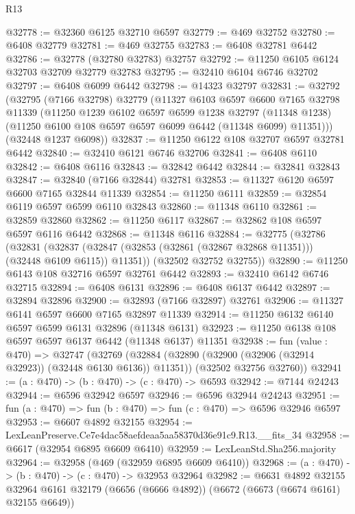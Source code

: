 \begin{lexlean}{R13}
\begin{coremodule}
@32778 := @32360 @6125 @32710 @6597
@32779 := @469 @32752
@32780 := @6408 @32779
@32781 := @469 @32755
@32783 := @6408 @32781 @6442
@32786 := @32778 (@32780 @32783) @32757
@32792 := @11250 @6105 @6124 @32703 @32709 @32779 @32783
@32795 := @32410 @6104 @6746 @32702
@32797 := @6408 @6099 @6442
@32798 := @14323 @32797
@32831 := @32792
    (@32795
      (@7166 @32798)
      @32779
      (@11327
        @6103
        @6597
        @6600
        @7165
        @32798
        @11339
        (@11250
          @1239
          @6102
          @6597
          @6599
          @1238
          @32797
          (@11348 @1238)
          (@11250 @6100 @108 @6597 @6597 @6099 @6442 (@11348 @6099) @11351)))
      (@32448 @1237 @6098))
@32837 := @11250 @6122 @108 @32707 @6597 @32781 @6442
@32840 := @32410 @6121 @6746 @32706
@32841 := @6408 @6110
@32842 := @6408 @6116
@32843 := @32842 @6442
@32844 := @32841 @32843
@32847 := @32840 (@7166 @32844) @32781
@32853 := @11327 @6120 @6597 @6600 @7165 @32844 @11339
@32854 := @11250 @6111
@32859 := @32854 @6119 @6597 @6599 @6110 @32843
@32860 := @11348 @6110
@32861 := @32859 @32860
@32862 := @11250 @6117
@32867 := @32862 @108 @6597 @6597 @6116 @6442
@32868 := @11348 @6116
@32884 := @32775
    (@32786
      (@32831
        (@32837 (@32847 (@32853 (@32861 (@32867 @32868 @11351))) (@32448 @6109 @6115)) @11351))
      (@32502 @32752 @32755))
@32890 := @11250 @6143 @108 @32716 @6597 @32761 @6442
@32893 := @32410 @6142 @6746 @32715
@32894 := @6408 @6131
@32896 := @6408 @6137 @6442
@32897 := @32894 @32896
@32900 := @32893 (@7166 @32897) @32761
@32906 := @11327 @6141 @6597 @6600 @7165 @32897 @11339
@32914 := @11250 @6132 @6140 @6597 @6599 @6131 @32896 (@11348 @6131)
@32923 := @11250 @6138 @108 @6597 @6597 @6137 @6442 (@11348 @6137) @11351
@32938 := fun (value : @470) =>
  @32747
    (@32769
      (@32884 (@32890 (@32900 (@32906 (@32914 @32923)) (@32448 @6130 @6136)) @11351))
      (@32502 @32756 @32760))
@32941 := (a : @470) -> (b : @470) -> (c : @470) -> @6593
@32942 := @7144 @24243
@32944 := @6596 @32942 @6597
@32946 := @6596 @32944 @24243
@32951 := fun (a : @470) => fun (b : @470) => fun (c : @470) => @6596 @32946 @6597
@32953 := @6607 @4892 @32155
@32954 := LexLeanPreserve.Ce7e4dac58aefdeaa5aa58370d36e91c9.R13.__fits_34
@32958 := @6617 (@32954 @6895 @6609 @6410)
@32959 := LexLeanStd.Sha256.majority
@32964 := @32958 (@469 (@32959 @6895 @6609 @6410))
@32968 := (a : @470) -> (b : @470) -> (c : @470) -> @32953 @32964
@32982 := @6631
    @4892
    @32155
    @32964
    @6161
    @32179
    (@6656 (@6666 @4892))
    (@6672 (@6673 (@6674 @6161) @32155 @6649))

\end{coremodule}
\end{lexlean}
